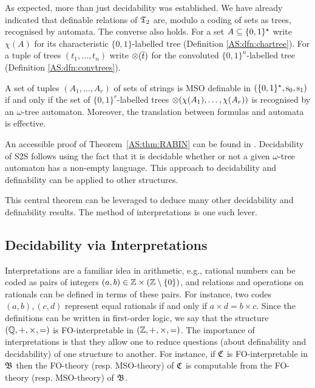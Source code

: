 As expected, more than just decidability was established. We have already indicated that definable relations of $\mathfrak{T}_2$ are, modulo a coding of sets as trees, recognised by automata. The converse also holds. For a set $A \subseteq \{0,1\}^\star$ write $\chi(A)$ for its characteristic $\{0,1\}$-labelled tree (Definition \ref{AS:dfn:chartree}). For a tuple of trees $(t_1,\dots,t_n)$ write $\otimes(\mbox{$\overline {t}$})$
for the convoluted $\{0,1\}^n$-labelled tree (Definition \ref{AS:dfn:convtrees}).  

\begin{theorem} \label{AS:thm:RABIN}
A set of tuples $(A_1,\dots,A_r)$ of sets of strings is MSO definable in $\mbox{$(\{0,1\}^{\star},\mathrm{s}_0, \mathrm{s}_1)$}$ if and only if the set of $\{0,1\}^r$-labelled trees 
$\otimes(\chi(A_1),\dots,\chi(A_r))$ is recognised by an $\omega$-tree automaton. Moreover, the translation between formulas and automata is effective.
\end{theorem}


An accessible proof of Theorem~\ref{AS:thm:RABIN} can be found in \cite{Thom90}. Decidability of S2S follows using the fact that it is decidable whether or not a given $\omega$-tree automaton has a non-empty language. This approach to decidability and definability can be applied to other structures. 

 
 
 
This central theorem can be leveraged to deduce many other decidability and definability results. The method of interpretations is one such lever.


\subsection{Decidability via Interpretations}
Interpretations are a familiar idea in arithmetic, e.g., rational numbers can be coded as pairs of integers $(a,b) \in \mathbb{Z} \times (\mathbb{Z} \setminus \{0\})$, and relations and operations on rationals can be defined in terms of these pairs. For instance, two codes $(a,b), (c,d)$ represent equal rationals if and only if $a\times d = b \times c$. Since the definitions can be written in first-order logic, we say that the structure $(\mathbb{Q},+,\times,=)$ is FO-interpretable in $(\mathbb{Z},+,\times,=)$. 
The importance of interpretations is that they allow one to reduce questions (about definability and decidability) of one structure to another. For instance, if $\mathfrak{C}$ is FO-interpretable in $\mathfrak{B}$ then the FO-theory (resp. MSO-theory) of $\mathfrak{C}$ is computable from the FO-theory (resp. MSO-theory) of $\mathfrak{B}$. 

